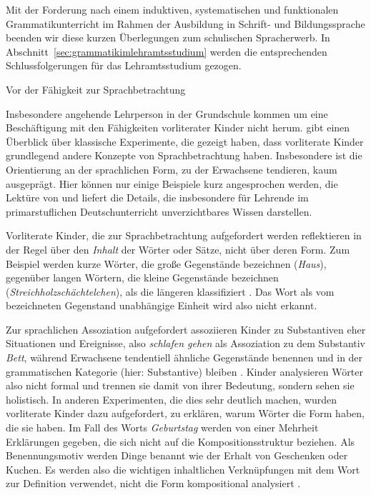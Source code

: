 Mit der Forderung nach einem induktiven, systematischen und funktionalen Grammatikunterricht im Rahmen der Ausbildung in Schrift- und Bildungssprache beenden wir diese kurzen Überlegungen zum schulischen Spracherwerb.
In Abschnitt~\ref{sec:grammatikimlehramtsstudium} werden die entsprechenden Schlussfolgerungen für das Lehramtsstudium gezogen.

\begin{Vertiefung}{Vor der Fähigkeit zur Sprachbetrachtung}
\label{vert:faehigkeitzursprachbetrachtung}

\noindent Insbesondere angehende Lehrperson in der Grundschule kommen um eine Beschäftigung mit den Fähigkeiten vorliterater Kinder nicht herum.
\citet[52--56]{Bredel2013} gibt einen Überblick über klassische Experimente, die gezeigt haben, dass vorliterate Kinder grundlegend andere Konzepte von Sprachbetrachtung haben.
Insbesondere ist die Orientierung an der sprachlichen Form, zu der Erwachsene tendieren, kaum ausgeprägt.
Hier können nur einige Beispiele kurz angesprochen werden, die Lektüre von \citet{Bredel2013} und \citet[71--134]{BredelEa2017} liefert die Details, die insbesondere für Lehrende im primarstuflichen Deutschunterricht unverzichtbares Wissen darstellen.

Vorliterate Kinder, die zur Sprachbetrachtung aufgefordert werden reflektieren in der Regel über den \textit{Inhalt} der Wörter oder Sätze, nicht über deren Form.
Zum Beispiel werden kurze Wörter, die große Gegenstände bezeichnen (\zB \textit{Haus}), gegenüber langen Wörtern, die kleine Gegenstände bezeichnen (\textit{Streichholzschächtelchen}), als die längeren klassifiziert \citep{Bosch1984}.
Das Wort als vom bezeichneten Gegenstand unabhängige Einheit wird also nicht erkannt.

Zur sprachlichen Assoziation aufgefordert assoziieren Kinder zu Substantiven eher Situationen und Ereignisse, also \zB \textit{schlafen gehen} als Assoziation zu dem Substantiv \textit{Bett}, während Erwachsene tendentiell ähnliche Gegenstände benennen und in der grammatischen Kategorie (hier: Substantive) bleiben \citep{Entwistle1966}.
Kinder analysieren Wörter also nicht formal und trennen sie damit von ihrer Bedeutung, sondern sehen sie holistisch.
In anderen Experimenten, die dies sehr deutlich machen, wurden vorliterate Kinder dazu aufgefordert, zu erklären, warum Wörter die Form haben, die sie haben.
Im Fall des Worts \textit{Geburtstag} werden \zB von einer Mehrheit Erklärungen gegeben, die sich nicht auf die Kompositionsstruktur beziehen.
Als Benennungsmotiv werden Dinge benannt wie der Erhalt von Geschenken oder Kuchen.
Es werden also die wichtigen inhaltlichen Verknüpfungen mit dem Wort zur Definition verwendet, nicht die Form kompositional analysiert \citep{Berko1974}.


\end{Vertiefung}
